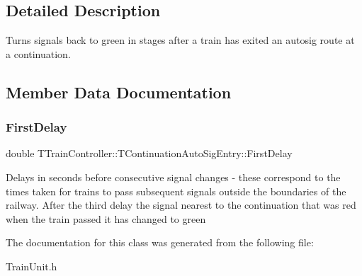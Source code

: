 \subsection{Detailed Description}
Turns signals back to green in stages after a train has exited an autosig route at a continuation. 

\subsection{Member Data Documentation}
\mbox{\label{class_t_train_controller_1_1_t_continuation_auto_sig_entry_ab5a944eed2be17d13d99a9070f78c785}} 
\subsubsection{\texorpdfstring{First\+Delay}{FirstDelay}}
{\footnotesize\ttfamily double T\+Train\+Controller\+::\+T\+Continuation\+Auto\+Sig\+Entry\+::\+First\+Delay}

Delays in seconds before consecutive signal changes -\/ these correspond to the times taken for trains to pass subsequent signals outside the boundaries of the railway. After the third delay the signal nearest to the continuation that was red when the train passed it has changed to green 

The documentation for this class was generated from the following file\+:\begin{DoxyCompactItemize}
\item 
Train\+Unit.\+h\end{DoxyCompactItemize}
